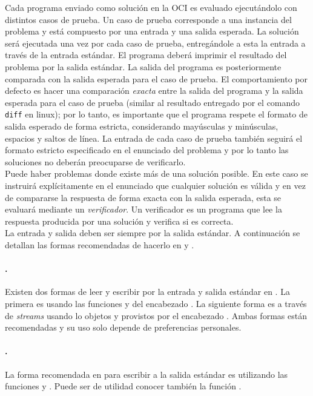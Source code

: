 Cada programa enviado como solución en la OCI es evaluado ejecutándolo con
distintos casos de prueba.
Un caso de prueba corresponde a una instancia del problema y está compuesto por
una entrada y una salida esperada.
La solución será ejecutada una vez por cada caso de prueba, entregándole a esta
la entrada a través de la entrada estándar.
El programa deberá imprimir el resultado del problema por la salida estándar.
La salida del programa es posteriormente comparada con la salida esperada para
el caso de prueba.
El comportamiento por defecto es hacer una comparación \textit{exacta} entre la
salida del programa y la salida esperada para el caso de prueba (similar al
resultado entregado por el comando \verb|diff| en linux);
 por lo tanto, es importante que el programa respete el formato de salida esperado
de forma estricta, considerando mayúsculas y minúsculas, espacios y saltos de
línea.
La entrada de cada caso de prueba también seguirá el formato estricto
especificado en el enunciado del problema y por lo tanto las soluciones no
deberán preocuparse de verificarlo.\\

Puede haber problemas donde existe más de una solución posible.
En este caso se instruirá explícitamente en el enunciado que cualquier solución
es válida y en vez de compararse la respuesta de forma exacta con la salida
esperada, esta se evaluará mediante un \emph{verificador}.
Un verificador es un programa que lee la respuesta producida por una solución y
verifica si es correcta.\\

La entrada y salida deben ser siempre por la salida estándar.
A continuación se detallan las formas recomendadas de hacerlo en \java y \cpp.
\paragraph{\cpp.} Existen dos formas de leer y escribir por la entrada y salida
  estándar en \cpp.
  La primera es usando las funciones  y  del encabezado
  .
  La siguiente forma es a través de \textit{streams} usando lo objetos
   y  provistos por el encabezado .
  Ambas formas están recomendadas y su uso solo depende de preferencias personales.
\paragraph{\java.} La forma recomendada en \java para escribir a la salida estándar es
  utilizando las funciones  y .
  Puede ser de utilidad conocer también la función .

